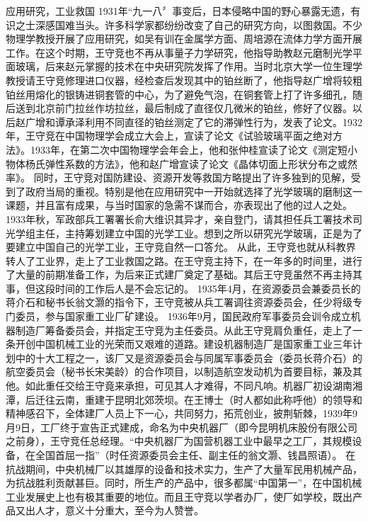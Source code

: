 应用研究，工业救国
1931年“九一八〞事变后，日本侵略中国的野心暴露无遗，有识之士深感国难当头。许多科学家都纷纷改变了自己的研究方向，以图救国。不少物理学教授开展了应用研究，如吴有训在金属学方面、周培源在流体力学方面开展工作。在这个时期，王守竞也不再从事量子力学研究，他指导助教赵元磨制光学平面玻璃，后来赵元掌握的技术在中央研究院发挥了作用。当时北京大学一位生理学教授请王守竞修理进口仪器，经检查后发现其中的铂丝断了，他指导赵广增将较粗铂丝用熔化的银铸进铜套管的中心，为了避免气泡，在铜套管上打了许多细孔，随后送到北京前门拉丝作坊拉丝，最后制成了直径仅几微米的铂丝，修好了仪器。以后赵广增和谭承泽利用不同直径的铂丝测定了它的滞弹性行为，发表了论文。1932年，王守竞在中国物理学会成立大会上，宣读了论文《试验玻璃平面之绝对方法》。1933年，在第二次中国物理学会年会上，他和张仲桂宣读了论文《测定短小物体杨氏弹性系数的方法》，他和赵广增宣读了论文《晶体切面上形状分布之或然率》。
同时，王守竞对国防建设、资源开发等救国方略提出了许多独到的见解，受到了政府当局的重视。特别是他在应用研究中一开始就选择了光学玻璃的磨制这一课题，并且富有成果，与当时国家的急需不谋而合，亦表现出了他的过人之处。1933年秋，军政部兵工署署长俞大维识其异才，亲自登门，请其担任兵工署技术司光学组主任，主持筹划建立中国的光学工业。想到之所以研究光学玻璃，正是为了要建立中国自己的光学工业，王守竞自然一口答允。
从此，王守竞也就从科教界转人了工业界，走上了工业救国之路。在王守竞主持下，在一年多的时间里，进行了大量的前期准备工作，为后来正式建厂奠定了基础。其后王守竞虽然不再主持其事，但这段时间的工作后人是不会忘记的。
1935年4月，在资源委员会兼委员长的蒋介石和秘书长翁文灏的指令下，王守竞被从兵工署调往资源委员会，任少将级专门委员，参与国家重工业厂矿建设。
1936年9月，国民政府军事委员会训令成立机器制造厂筹备委员会，并指定王守竞为主任委员。从此王守竞肩负重任，走上了一条开创中国机械工业的光荣而又艰难的道路。建设机器制造厂是国家重工业三年计划中的十大工程之一，该厂又是资源委员会与同属军事委员会（委员长蒋介石）的航空委员会（秘书长宋美龄）的合作项目，以制造航空发动机为首要目标，兼及其他。如此重任交给王守竟来承担，可见其人才难得，不同凡响。机器厂初设湖南湘潭，后迁往云南，重建于昆明北郊茨坝。在王博士（时人都如此称呼他）的领导和精神感召下，全体建厂人员上下一心，共同努力，拓荒创业，披荆斩棘，1939年9月9日，工厂终于宣告正式建成，命名为中央机器厂（即今昆明机床股份有限公司之前身），王守竞任总经理。“中央机器厂为国营机器工业中最早之工厂，其规模设备，在全国首屈一指”（时任资源委员会主任、副主任的翁文灏、钱昌照语）。
在抗战期间，中央机械厂以其雄厚的设备和技术实力，生产了大量军民用机械产品，为抗战胜利贡献甚巨。同时，所生产的产品中，很多都属“中国第一”，在中国机械工业发展史上也有极其重要的地位。而且王守竞以学者办厂，使厂如学校，既出产品又出人才，意义十分重大，至今为人赞誉。
